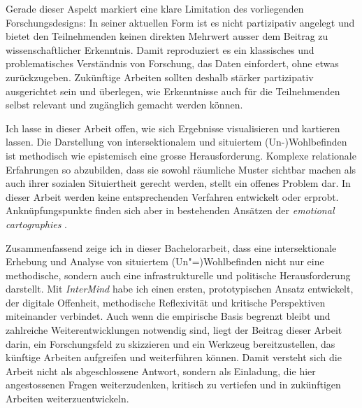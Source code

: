 Gerade dieser Aspekt markiert eine klare Limitation des vorliegenden Forschungsdesigns: In seiner aktuellen Form ist es nicht partizipativ angelegt und bietet den Teilnehmenden keinen direkten Mehrwert ausser dem Beitrag zu wissenschaftlicher Erkenntnis. Damit reproduziert es ein klassisches und problematisches Verständnis von Forschung, das Daten einfordert, ohne etwas zurückzugeben. Zukünftige Arbeiten sollten deshalb stärker partizipativ ausgerichtet sein und überlegen, wie Erkenntnisse auch für die Teilnehmenden selbst relevant und zugänglich gemacht werden können.

Ich lasse in dieser Arbeit offen, wie sich Ergebnisse visualisieren und kartieren lassen. Die Darstellung von intersektionalem und situiertem (Un-)Wohlbefinden ist methodisch wie epistemisch eine grosse Herausforderung. Komplexe relationale Erfahrungen so abzubilden, dass sie sowohl räumliche Muster sichtbar machen als auch ihrer sozialen Situiertheit gerecht werden, stellt ein offenes Problem dar. In dieser Arbeit werden keine entsprechenden Verfahren entwickelt oder erprobt. Anknüpfungspunkte finden sich aber in bestehenden Ansätzen der \emph{emotional cartographies} \parencite[\gls{bspw}][]{bleischExploratoryGeovisualizationsSupporting2019}.

Zusammenfassend zeige ich in dieser Bachelorarbeit, dass eine intersektionale Erhebung und Analyse von situiertem (Un\nobreakdash"=)Wohlbefinden nicht nur eine methodische, sondern auch eine infrastrukturelle und politische Herausforderung darstellt. Mit \textit{InterMind} habe ich einen ersten, prototypischen Ansatz entwickelt, der digitale Offenheit, methodische Reflexivität und kritische Perspektiven miteinander verbindet. Auch wenn die empirische Basis begrenzt bleibt und zahlreiche Weiterentwicklungen notwendig sind, liegt der Beitrag dieser Arbeit darin, ein Forschungsfeld zu skizzieren und ein Werkzeug bereitzustellen, das künftige Arbeiten aufgreifen und weiterführen können. Damit versteht sich die Arbeit nicht als abgeschlossene Antwort, sondern als Einladung, die hier angestossenen Fragen weiterzudenken, kritisch zu vertiefen und in zukünftigen Arbeiten weiterzuentwickeln.

